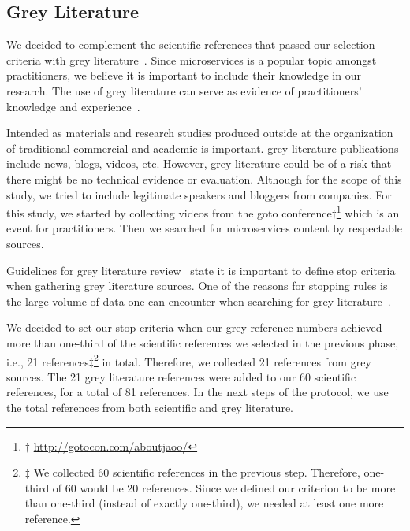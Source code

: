 \subsection{Grey Literature}

We decided to complement the scientific references that passed our selection criteria with grey literature~\cite{Garousi2016}. Since microservices is a popular topic amongst practitioners, we believe it is important to include their knowledge in our research. The use of grey literature can serve as evidence of practitioners' knowledge and experience~\cite{Kamei2019}.

Intended as materials and research studies produced outside at the organization of traditional commercial and academic is important. grey literature publications include news, blogs, videos, etc. However, grey literature could be of a risk that there might be no technical evidence or evaluation. Although for the scope of this study, we tried to include legitimate speakers and bloggers from companies.
%
For this study, we started by collecting videos from the goto conference$\dagger$\let\thefootnote\relax\footnote{$\dagger$ \url{http://gotocon.com/aboutjaoo/}} which is an event for practitioners. Then we searched for microservices content by respectable sources. 

Guidelines for grey literature review~\cite{Garousi2019} state it is important to define stop criteria when gathering grey literature sources. One of the reasons for stopping rules is the large volume of data one can encounter when searching for grey literature~\cite{Garousi2019}. 

We decided to set our stop criteria when our grey reference numbers achieved more than one-third of the scientific references we selected in the previous phase, i.e., 21 references$\ddagger$\let\thefootnote\relax\footnote{$\ddagger$ We collected 60 scientific references in the previous step. Therefore, one-third of 60 would be 20 references. Since we defined our criterion to be more than one-third (instead of exactly one-third), we needed at least one more reference.} in total. Therefore, we collected 21 references from grey sources.
%
The 21 grey literature references were added to our 60 scientific references, for a total of 81 references. %
In the next steps of the protocol, we use the total references from both scientific and grey literature.




